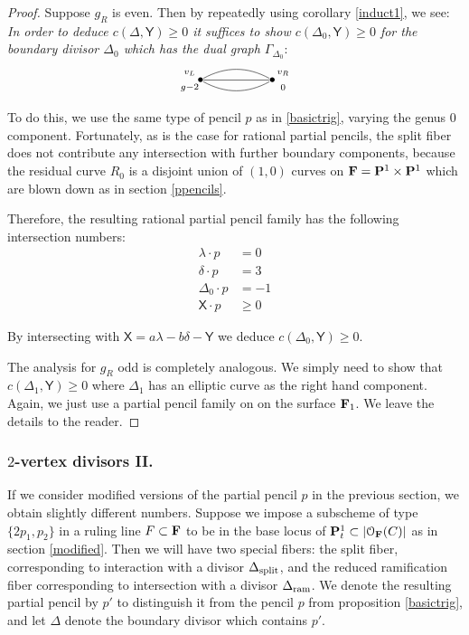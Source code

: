\documentclass[reqno, 10 pt]{article}
\theoremstyle{definition}
\theoremstyle{remark}
\numberwithin{equation}{section}
\numberwithin{thm}{section}
\numberwithin{prop}{section}
\numberwithin{lem}{section}
\numberwithin{cor}{section}
\numberwithin{conj}{section}
\numberwithin{defn}{section}
\newcommand{\F}{{\mathbf F}}
\newcommand{\sfY}{{\mathsf Y}}
\newcommand{\sfX}{{\mathsf X}}
\newcommand{\cO}{{\mathcal O}}
\renewcommand{\P}{{\bf P}}
\renewcommand{\F}{{\bf F}}
\newcommand {\spl}{{\rm split}}
\newcommand {\ram}{{\rm ram}}
\begin{document}
\begin{proof}
Suppose $g_{R}$ is even. Then by repeatedly using corollary \ref{induct1}, we see: {\sl In order to deduce $c(\Delta, \sfY) \geq 0$ it suffices to show $c(\Delta_0, {\sfY}) \geq 0$ for the boundary divisor $\Delta_{0}$ which has the dual graph $\Gamma_{\Delta_{0}}$}: 
 \[ \xygraph{
!{<0cm,0cm>;<1cm,0cm>:<0cm,1cm>::}
!{(0,0) }*{\bullet}="l"!{(-.3,.2)}{\scriptstyle v_L}!{(-.3,-.21)}{\scriptstyle g-2}
!{(2,0) }*{\bullet}="r"!{(2.3,.2)}{\scriptstyle v_R}!{(2.3,-.2)}{\scriptstyle 0}
 "l"-@/^.3cm/"r" 
"l"-"r" 
"l"-@/_.3cm/"r" 
}  \]

To do this, we use the same type of pencil $p$ as in \autoref{basictrig}, varying the genus $0$ component.   Fortunately, as is the case for rational partial pencils, the split fiber does not contribute any intersection with further boundary components, because the residual curve $R_0$ is a disjoint union of $(1,0)$ curves on $\F = \P^{1} \times \P^{1}$ which are blown down as in section \ref{ppencils}.  

Therefore, the resulting rational partial pencil family has the following intersection numbers: 
\begin{align*}
\lambda \cdot p &= 0\\
\delta \cdot p &= 3\\
\Delta_0 \cdot p &= -1\\
{\sfX} \cdot p &\geq 0
\end{align*}

By intersecting with $\sfX = a\lambda - b\delta - {\sfY}$ we deduce $c(\Delta_0, {\sfY}) \geq 0$. 

The analysis for $g_R$ odd is completely analogous.  We simply need to show that $c(\Delta_{1}, {\sfY}) \geq 0$ where $\Delta_{1}$ has an elliptic curve as the right hand component. Again, we just use a partial pencil family on on the surface $\F_{1}$. We leave the details to the reader. 
\end{proof}


\subsubsection{$2$-vertex divisors II.}
If we consider modified versions of the partial pencil $p$ in the previous section, we obtain slightly different numbers.  Suppose we impose a subscheme of type $\{2p_{1},p_{2}\}$ in a ruling line $F \subset \F$ to be in the base locus of $\P^{1}_{t} \subset |\cO_{\F}(C)|$ as in section \ref{modified}. Then we will have two special fibers: the split fiber, corresponding to interaction with a divisor $\Delta_{\spl}$, and the reduced ramification fiber corresponding to intersection with a divisor $\Delta_{\ram}$. We denote the resulting partial pencil by $p'$ to distinguish it from the pencil $p$ from proposition \autoref{basictrig}, and let $\Delta$ denote the boundary divisor which contains $p'$.  
\end{document}
